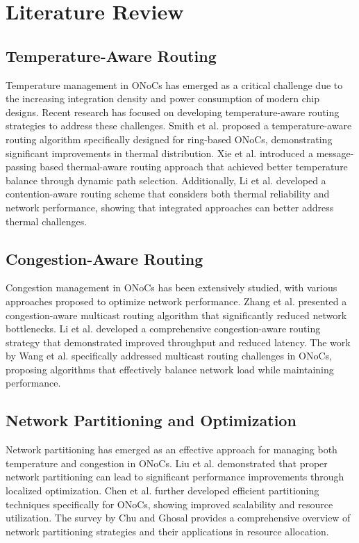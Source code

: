 \documentclass[12pt]{article}
\begin{document}
\section{Literature Review}
\subsection{Temperature-Aware Routing}
Temperature management in ONoCs has emerged as a critical challenge due to the increasing integration density and power consumption of modern chip designs. Recent research has focused on developing temperature-aware routing strategies to address these challenges. Smith et al. \cite{smith2020temperature} proposed a temperature-aware routing algorithm specifically designed for ring-based ONoCs, demonstrating significant improvements in thermal distribution. Xie et al. \cite{xie2020thermal} introduced a message-passing based thermal-aware routing approach that achieved better temperature balance through dynamic path selection. Additionally, Li et al. \cite{li2021contention} developed a contention-aware routing scheme that considers both thermal reliability and network performance, showing that integrated approaches can better address thermal challenges.

\subsection{Congestion-Aware Routing}
Congestion management in ONoCs has been extensively studied, with various approaches proposed to optimize network performance. Zhang et al. \cite{zhang2019congestion} presented a congestion-aware multicast routing algorithm that significantly reduced network bottlenecks. Li et al. \cite{li2018congestion} developed a comprehensive congestion-aware routing strategy that demonstrated improved throughput and reduced latency. The work by Wang et al. \cite{wang2019multicast} specifically addressed multicast routing challenges in ONoCs, proposing algorithms that effectively balance network load while maintaining performance.

\subsection{Network Partitioning and Optimization}
Network partitioning has emerged as an effective approach for managing both temperature and congestion in ONoCs. Liu et al. \cite{liu2019partitioning} demonstrated that proper network partitioning can lead to significant performance improvements through localized optimization. Chen et al. \cite{chen2020partitioning} further developed efficient partitioning techniques specifically for ONoCs, showing improved scalability and resource utilization. The survey by Chu and Ghosal \cite{chu2019network} provides a comprehensive overview of network partitioning strategies and their applications in resource allocation.
\end{document}
